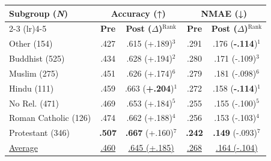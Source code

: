 \begin{tabular}{@{} p{2.8cm} | c c | c c @{}}
\toprule
\multirow{2}{*}{\textbf{Subgroup (\textbf{\textit{N}})}} & \multicolumn{2}{c|}{\textbf{Accuracy (↑)}} & \multicolumn{2}{c}{\textbf{NMAE (↓)}} \\
\cmidrule(lr){2-3} \cmidrule(lr){4-5}
& \textbf{Pre} & \textbf{Post ($\Delta$)}$^{\text{Rank}}$ & \textbf{Pre} & \textbf{Post ($\Delta$)}$^{\text{Rank}}$ \\
\midrule
Other (154) & .427 & .615 (+.189)$^{3}$ & .291 & .176 (\textbf{-.114})$^{1}$ \\
Buddhist (525) & .434 & .628 (+.194)$^{2}$ & .280 & .171 (-.109)$^{3}$ \\
Muslim (275) & .451 & .626 (+.174)$^{6}$ & .279 & .181 (-.098)$^{6}$ \\
Hindu (111) & .459 & .663 (\textbf{+.204})$^{1}$ & .272 & .158 (\textbf{-.114})$^{1}$ \\
No Rel. (471) & .469 & .653 (+.184)$^{5}$ & .255 & .155 (-.100)$^{5}$ \\
Roman Catholic (126) & .474 & .662 (+.188)$^{4}$ & .256 & .153 (-.103)$^{4}$ \\
Protestant (346) & \textbf{.507} & \textbf{.667} (+.160)$^{7}$ & \textbf{.242} & \textbf{.149} (-.093)$^{7}$ \\
\midrule
\underline{Average} & \underline{.460} & \underline{.645 (+.185)} & \underline{.268} & \underline{.164 (-.104)} \\
\bottomrule
\end{tabular}
